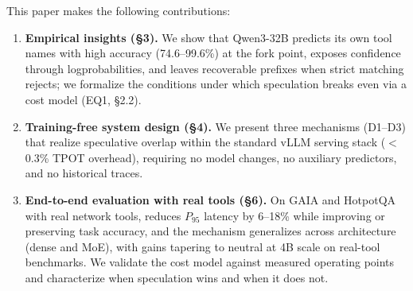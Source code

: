 This paper makes the following contributions:
\begin{enumerate}
\item \textbf{Empirical insights (\S3).}
We show that Qwen3-32B predicts its own tool names with high accuracy (74.6--99.6\%) at the
fork point, exposes confidence through logprobabilities, and leaves
recoverable prefixes when strict matching rejects; we formalize the conditions under
which speculation breaks even via a cost model (EQ1, \S2.2).
\item \textbf{Training-free system design (\S4).}
We present three mechanisms (D1--D3) that realize speculative overlap within the standard
vLLM serving stack ($<$0.3\% TPOT overhead), requiring no model changes, no auxiliary
predictors, and no historical traces.
\item \textbf{End-to-end evaluation with real tools (\S6).}
On GAIA and HotpotQA with real network tools, \spork{} reduces $P_{95}$ latency by 6--18\%
while improving or preserving task accuracy, and the mechanism generalizes across
architecture (dense and MoE), with gains tapering to neutral at 4B scale on real-tool
benchmarks.
We validate the cost model against measured operating points and characterize when
speculation wins and when it does not.
\end{enumerate}
